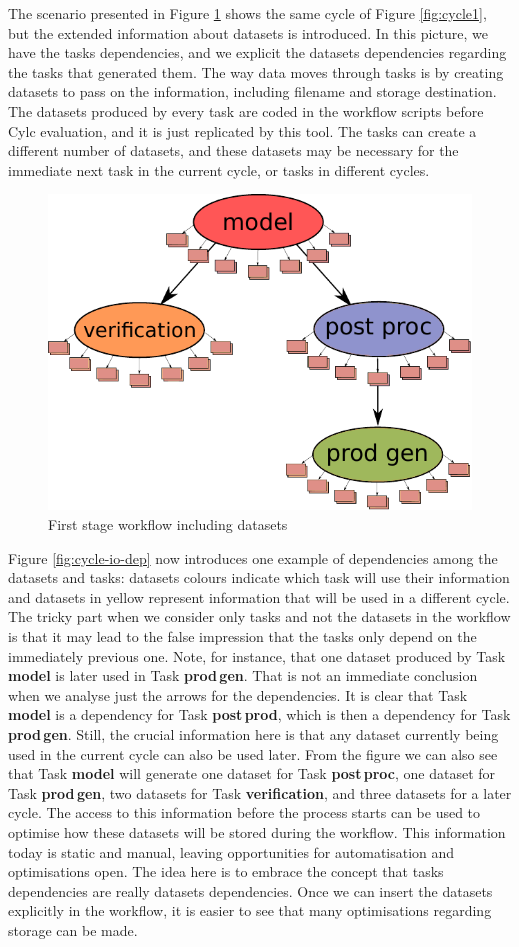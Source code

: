 \documentclass[a4paper]{article}
\begin{document}
The scenario presented in Figure \ref{fig:cycle-io} shows the same cycle of Figure \ref{fig:cycle1}, but the extended information about datasets is introduced.
In this picture, we have the tasks dependencies, and we explicit the datasets dependencies regarding the tasks that generated them.
The way data moves through tasks is by creating datasets to pass on the information, including filename and storage destination. The datasets produced by every task are coded in the workflow scripts before Cylc evaluation, and it is just replicated by this tool. The tasks can create a different number of datasets, and these datasets may be necessary for the immediate next task in the current cycle, or tasks in different cycles.

\begin{figure}[H]
  \centering
  \includegraphics[width=0.6\columnwidth]{cycle-io}
  \caption{First stage workflow including datasets}
  \label{fig:cycle-io}
\end{figure}

Figure \ref{fig:cycle-io-dep} now introduces one example of dependencies among the datasets and tasks: datasets colours indicate which task will use their information and datasets in yellow represent information that will be used in a different cycle. The tricky part when we consider only tasks and not the datasets in the workflow is that it may lead to the false impression that the tasks only depend on the immediately previous one. Note, for instance, that one dataset produced by Task \textbf{model} is later used in Task \textbf{prod\,gen}. That is not an immediate conclusion when we analyse just the arrows for the dependencies. It is clear that Task \textbf{model} is a dependency for Task \textbf{post\,prod}, which is then a dependency for Task \textbf{prod\,gen}. Still, the crucial information here is that any dataset currently being used in the current cycle can also be used later. From the figure we can also see that Task \textbf{model} will generate one dataset for Task \textbf{post\,proc}, one dataset for Task \textbf{prod\,gen}, two datasets for Task \textbf{verification}, and three datasets for a later cycle.
The access to this information before the process starts can be used to optimise how these datasets will be stored during the workflow. This information today is static and manual, leaving opportunities for automatisation and optimisations open.
The idea here is to embrace the concept that tasks dependencies are really datasets dependencies. Once we can insert the datasets explicitly in the workflow, it is easier to see that many optimisations regarding storage can be made.
\end{document}
